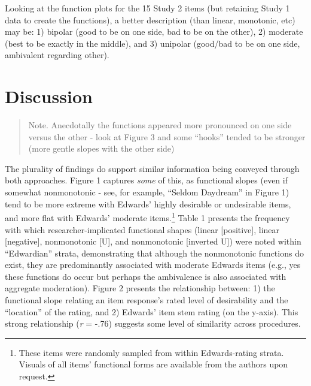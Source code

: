 \documentclass[
  ,jou]{apa6}
\begin{document}
Looking at the function plots for the 15 Study 2 items (but retaining Study 1 data to create the functions), a better description (than linear, monotonic, etc) may be: 1) bipolar (good to be on one side, bad to be on the other), 2) moderate (best to be exactly in the middle), and 3) unipolar (good/bad to be on one side, ambivalent regarding other).

\hypertarget{discussion}{%
\section{Discussion}\label{discussion}}

\begin{quote}
Note. Anecdotally the functions appeared more pronounced on one side versus the other - look at Figure 3 and some ``hooks'' tended to be stronger (more gentle slopes with the other side)
\end{quote}

The plurality of findings do support similar information being conveyed through both approaches. Figure 1 captures \emph{some} of this, as functional slopes (even if somewhat nonmonotonic - see, for example, ``Seldom Daydream'' in Figure 1) tend to be more extreme with Edwards' highly desirable or undesirable items, and more flat with Edwards' moderate items.\footnote{These items were randomly sampled from within Edwards-rating strata. Visuals of all items' functional forms are available from the authors upon request.} Table 1 presents the frequency with which researcher-implicated functional shapes (linear {[}positive{]}, linear {[}negative{]}, nonmonotonic {[}U{]}, and nonmonotonic {[}inverted U{]}) were noted within ``Edwardian'' strata, demonstrating that although the nonmonotonic functions do exist, they are predominantly associated with moderate Edwards items (e.g., yes these functions do occur but perhaps the ambivalence is also associated with aggregate moderation). Figure 2 presents the relationship between: 1) the functional slope relating an item response's rated level of desirability and the ``location'' of the rating, and 2) Edwards' item stem rating (on the y-axis). This strong relationship (\emph{r} = -.76) suggests some level of similarity across procedures.
\end{document}
